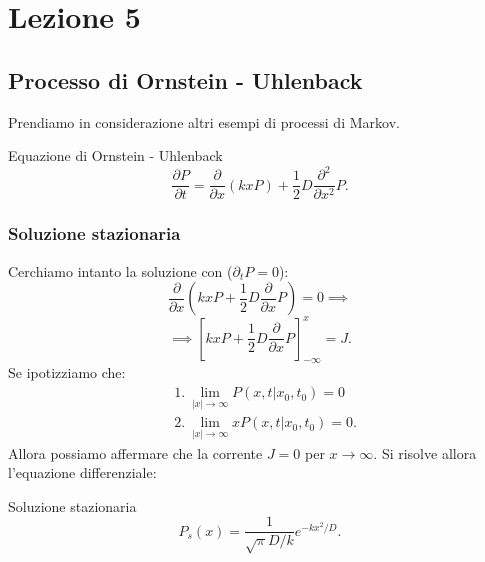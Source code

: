 \section{Lezione 5}%
\label{sub:Lezione 5}
\subsection{Processo di Ornstein - Uhlenback}%
\label{sub:Processo di Ornstein - Uhlenback}
Prendiamo in considerazione altri esempi di processi di Markov.
\begin{redbox}{Equazione di Ornstein - Uhlenback}
    \[
	\frac{\partial P}{\partial t} = \frac{\partial }{\partial x} (kxP) + \frac{1}{2}D\frac{\partial ^2}{\partial x^2} P
    .\] 
\end{redbox}
\noindent
\subsubsection{Soluzione stazionaria}%
\label{subsub:Soluzione stazionaria}
Cerchiamo intanto la soluzione con ($\partial_{t}P=0$):
\[
    \frac{\partial }{\partial x} \left(kxP + \frac{1}{2}D \frac{\partial }{\partial x} P\right) = 0 \implies
\] 
\[
    \implies  \left[kxP + \frac{1}{2}D \frac{\partial }{\partial x} P\right]_{-\infty}^{x} = J
.\] 
Se ipotizziamo che:
\[\begin{aligned}
    & 1. \ \lim_{\left|x\right| \to \infty} P(x, t|x_0,t_0) = 0 \\
    & 2. \ \lim_{\left|x\right| \to \infty} xP(x, t|x_0,t_0) = 0
.\end{aligned}\]
Allora possiamo affermare che la corrente $J=0$ per $x\to \infty$. Si risolve allora l'equazione differenziale:
\begin{bluebox}{Soluzione stazionaria}
    \[
    P_s(x) = \frac{1}{\sqrt{\pi} D /k}e^{-kx^2 / D}
    .\] 
\end{bluebox}
\noindent
